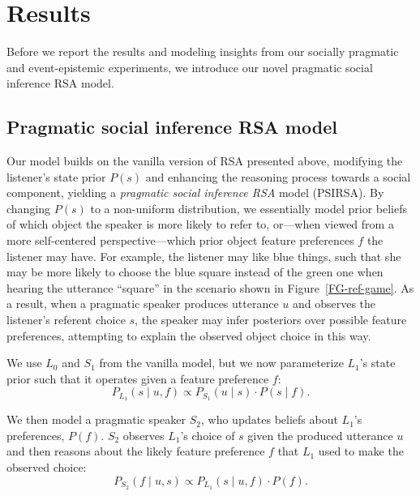 \documentclass[10pt,a4paper]{article}
\begin{document}
\section*{Results}

Before we report the results and modeling insights from our socially pragmatic and event-epistemic experiments, we introduce our novel pragmatic social inference RSA model.


\subsection*{Pragmatic social inference RSA model}

Our model builds on the vanilla version of RSA presented above, modifying the listener's state prior $P(s)$ and enhancing the reasoning process towards a social component, yielding a \emph{pragmatic social inference RSA} model (PSIRSA). %
By changing $P(s)$ to a non-uniform distribution, we essentially model prior beliefs of which object the speaker is more likely to refer to, or---when viewed from a more self-centered perspective---which prior object feature preferences $f$ the listener may have. 
For example, the listener may like blue things, such that she may be more likely to choose the blue square instead of the green one when hearing the utterance ``square'' in the scenario shown in Figure~\ref{FG-ref-game}.
As a result, when a pragmatic speaker produces utterance $u$ and observes the listener's referent choice $s$, the speaker may infer posteriors over possible feature preferences, attempting to explain the observed object choice in this way.

We use $L_0$ and $S_1$ from the vanilla model, but we now parameterize $L_1$'s state prior such that it operates given a feature preference $f$:
\begin{equation}
P_{L_{1}}(s\mid u,f) \propto P_{S_{1}}(u \mid s) \cdot P(s \mid f).
\end{equation}

We then model a pragmatic speaker $S_2$, who updates beliefs about $L_1$'s preferences, $P(f)$.
$S_2$ observes $L_1$'s choice of $s$ given the produced utterance $u$ and then reasons about the likely feature preference $f$ that $L_1$ used to make the observed choice:
\begin{equation}
P_{S_{2}}(f\mid u,s) \propto P_{L_{1}}(s \mid u,f) \cdot P(f).
\end{equation}
\end{document}
